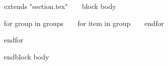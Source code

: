~{ extends "section.tex" }~
~{ block body }~
\begin{tabenum}[\phantom{}]
  ~{ for group in groups }~
    ~{ for item in group }~
    ~{ endfor }~

  ~{ endfor }~
\end{tabenum}
\vspace{-10pt}
~{ endblock body }~
